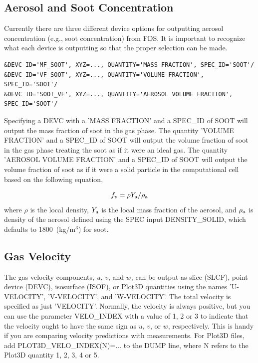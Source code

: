 \documentclass[11pt]{book}
\begin{document}
\subsection{Aerosol and Soot Concentration}
\label{info:soot}

Currently there are three different device options for outputting aerosol concentration (e.g., soot concentration) from FDS. It is important to recognize what each device is outputting so that the proper selection can be made.

\begin{lstlisting}
&DEVC ID='MF_SOOT', XYZ=..., QUANTITY='MASS FRACTION', SPEC_ID='SOOT'/
&DEVC ID='VF_SOOT', XYZ=..., QUANTITY='VOLUME FRACTION', SPEC_ID='SOOT'/
&DEVC ID='SOOT_VF', XYZ=..., QUANTITY='AEROSOL VOLUME FRACTION', SPEC_ID='SOOT'/
\end{lstlisting}

\noindent Specifying a {\ct DEVC} with a {\ct 'MASS FRACTION'} and a {\ct SPEC\_ID} of {\ct SOOT} will output the mass fraction of soot in the gas phase. The quantity {\ct 'VOLUME FRACTION'} and a {\ct SPEC\_ID} of {\ct SOOT} will output the volume fraction of soot in the gas phase treating the soot as if it were an ideal gas. The quantity {\ct 'AEROSOL VOLUME FRACTION'} and a {\ct SPEC\_ID} of {\ct SOOT} will output the volume fraction of soot as if it were a solid particle in the computational cell based on the following equation,

\begin{equation}\label{eq:soot_volume_fraction}
f_v = \rho Y_{\rm a} / \rho_{\rm a}
\end{equation}
\noindent where $\rho$ is the local density, $Y_{\rm a}$ is the local mass fraction of the aerosol, and $\rho_{\rm a}$ is density of the aerosol defined using the {\ct SPEC} input {\ct DENSITY\_SOLID}, which defaults to 1800~(kg/m$^3$) for soot.

\subsection{Gas Velocity}
\label{info:velocity}

The gas velocity components, $u$, $v$, and $w$, can be output as slice ({\ct SLCF}), point device ({\ct DEVC}), isosurface ({\ct ISOF}), or Plot3D quantities using the names {\ct 'U-VELOCITY'}, {\ct 'V-VELOCITY'}, and {\ct 'W-VELOCITY'}. The total velocity is specified as just {\ct 'VELOCITY'}. Normally, the velocity is always positive, but you can use the parameter {\ct VELO\_INDEX} with a value of 1, 2 or 3 to indicate that the velocity ought to have the same sign as $u$, $v$, or $w$, respectively. This is handy if you are comparing velocity predictions with measurements. For Plot3D files, add {\ct PLOT3D\_VELO\_INDEX(N)=...} to the {\ct DUMP} line, where {\ct N} refers to the Plot3D quantity 1, 2, 3, 4 or 5.
\end{document}

